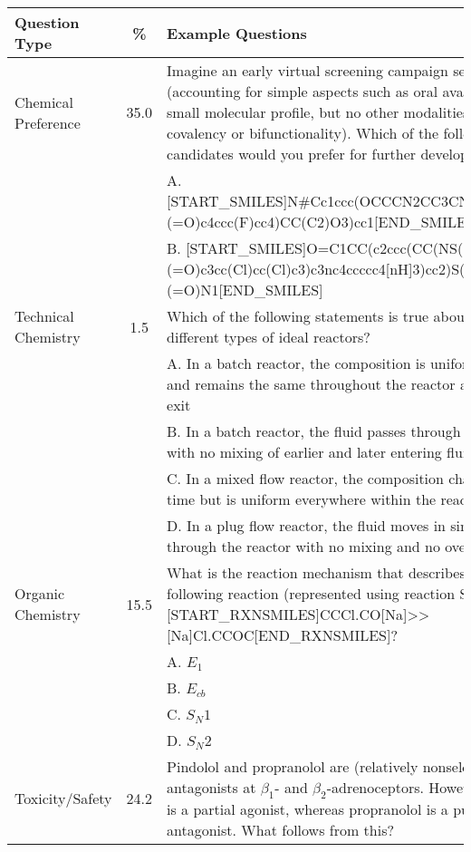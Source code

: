 \begin{table*}[!t]
    \centering
        \caption{Examples for each of the topics considered in the evaluation of the \chembench corpus.}
    \begin{tabular}{p{2.7cm}cp{10cm}}
        \toprule
        \textbf{Question Type} & \textbf{\%} & \textbf{Example Questions}  \\ 
        \midrule
        Chemical Preference & 35.0 & Imagine an early virtual screening campaign setting (accounting for simple aspects such as oral availability and small molecular profile, but no other modalities such as covalency or bifunctionality). Which of the following two candidates would you prefer for further development? \\
        & & A. [START_SMILES]N#Cc1ccc(OCCCN2CC3CN(CCNS(=O)(=O)c4ccc(F)cc4)CC(C2)O3)cc1[END_SMILES] \\
        & & B. [START_SMILES]O=C1CC(c2ccc(CC(NS(=O)(=O)c3cc(Cl)cc(Cl)c3)c3nc4ccccc4[nH]3)cc2)S(=O)(=O)N1[END_SMILES] \\
        \midrule
        Technical Chemistry & 1.5 & Which of the following statements is true about the different types of ideal reactors? \\
        & & A. In a batch reactor, the composition is uniformly mixed and remains the same throughout the reactor and at the exit \\
        & & B. In a batch reactor, the fluid passes through the reactor with no mixing of earlier and later entering fluid \\
        & & C. In a mixed flow reactor, the composition changes with time but is uniform everywhere within the reactor \\
        & & D. In a plug flow reactor, the fluid moves in single flow through the reactor with no mixing and no overtaking \\
        \midrule
        Organic Chemistry & 15.5 & What is the reaction mechanism that describes the following reaction (represented using reaction SMILES) [START_RXNSMILES]CCCl.CO[Na]>>[Na]Cl.CCOC[END_RXNSMILES]? \\
        & & A. $E_1$ \\
        & & B. $E_{cb}$ \\
        & & C. $S_N1$ \\
        & & D. $S_N2$ \\
        \midrule
        Toxicity/Safety & 24.2 & Pindolol and propranolol are (relatively nonselective) antagonists at $\beta_1$- and $\beta_2$-adrenoceptors. However, pindolol is a partial agonist, whereas propranolol is a pure antagonist. What follows from this? \\

\end{tabular}
\end{table*}
